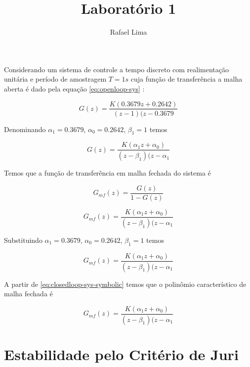 \documentclass[a4paper,11pt]{article}
\title{Laboratório 1} %
\author{Rafael Lima}
\begin{document}

\section{}

Considerando um sistema de controle a tempo discreto com realimentação unitária e período de amostragem $T = 1s$ cuja função de transferência a malha aberta é dado pela equação \ref{eq:openloop-sys} :

\begin{equation}\label{eq:openloop-sys}
G(z) = \frac{K(0.3679z + 0.2642)}{(z-1)(z-0.3679}
\end{equation}

Denominando $\alpha_1 = 0.3679$, $\alpha_0 = 0.2642$, $\beta_1 = 1$ temos

\begin{equation}\label{eq:openloop-sys-symbolic}
    G(z) = \frac{K(\alpha_1 z + \alpha_0)}{(z-\beta_1)(z-\alpha_1}
\end{equation}

Temos que a função de transferência em malha fechada do sistema é

$$G_{mf}(z) = \frac{G(z)}{1-G(z)}$$

\begin{equation}\label{eq:closedloop-sys-symbolic}
    G_{mf}(z) = \frac{K(\alpha_1 z + \alpha_0)}{(z-\beta_1)(z-\alpha_1}
\end{equation}

Substituindo $\alpha_1 = 0.3679$, $\alpha_0 = 0.2642$, $\beta_1 = 1$ temos

\begin{equation}\label{eq:closedloop-sys}
    G_{mf}(z) = \frac{K(\alpha_1 z + \alpha_0)}{(z-\beta_1)(z-\alpha_1}
\end{equation}

A partir de \ref{eq:closedloop-sys-symbolic} temos que o polinômio característico de malha fechada é

\begin{equation}\label{eq:poly-sys-symbolic}
    G_{mf}(z) = \frac{K(\alpha_1 z + \alpha_0)}{(z-\beta_1)(z-\alpha_1}
\end{equation}

\section{Estabilidade pelo Critério de Juri}
\end{document}

